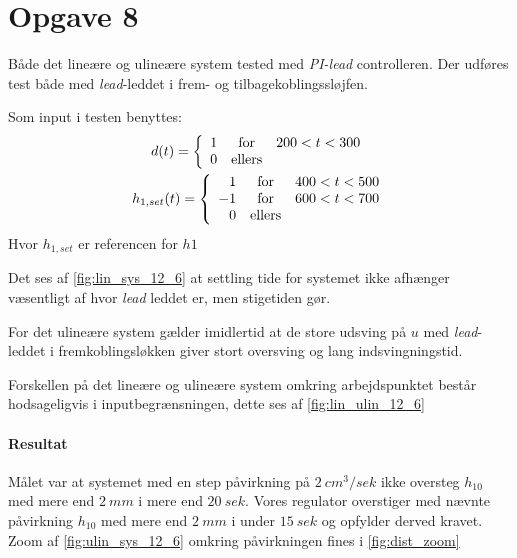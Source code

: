 \section{Opgave 8}
Både det lineære og ulineære system tested med \emph{PI-lead} controlleren.
Der udføres test både med \emph{lead}-leddet i frem- og tilbagekoblingssløjfen.

Som input i testen benyttes:
\begin{gather*}
d(t) = \left\{\begin{array}{r c l}
1 & \mbox{for} & 200<t<300\\
0 & \mbox{ellers} & 
\end{array}\right.\\
h_{1, set}(t) = \left\{\begin{array}{r c l}
 1 & \mbox{for} & 400<t<500\\
-1 & \mbox{for} & 600<t<700\\
 0 & \mbox{ellers} & 
\end{array}\right.\\
\end{gather*}
Hvor $h_{1, set}$ er referencen for $h1$

Det ses af \ref{fig:lin_sys_12_6} at settling tide for systemet ikke afhænger
væsentligt af hvor \emph{lead} leddet er, men stigetiden gør.

For det ulineære system gælder imidlertid at de store udsving på $u$ med
\emph{lead}-leddet i fremkoblingsløkken giver stort oversving og lang
indsvingningstid.

Forskellen på det lineære og ulineære system omkring arbejdspunktet består
hodsageligvis i inputbegrænsningen, dette ses af \ref{fig:lin_ulin_12_6}

\paragraph{Resultat}
	Målet var at systemet med en step påvirkning på $2~cm^3/sek$ ikke oversteg
	$h_{10}$ med mere end $2~mm$ i mere end $20~sek$. Vores regulator overstiger
	med nævnte påvirkning $h_{10}$ med mere end $2~mm$ i under $15~sek$ og opfylder derved
	kravet. Zoom af \ref{fig:ulin_sys_12_6} omkring påvirkningen fines i
	\ref{fig:dist_zoom}




